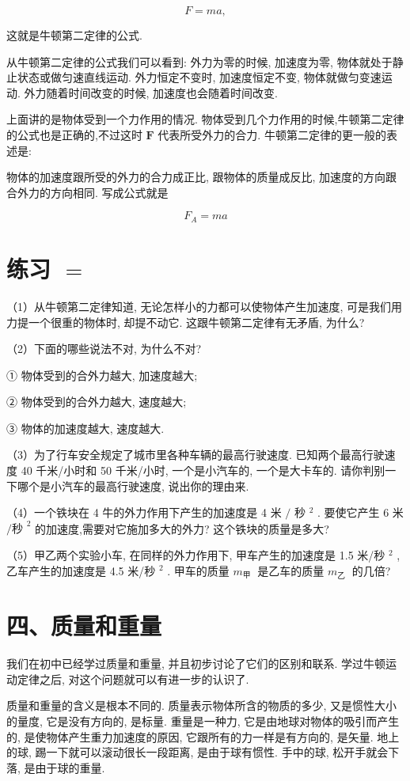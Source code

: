 \documentclass[10pt]{article}
\begin{document}
\[
F = {ma},
\]

这就是牛顿第二定律的公式.

从牛顿第二定律的公式我们可以看到: 外力为零的时候, 加速度为零, 物体就处于静止状态或做匀速直线运动. 外力恒定不变时, 加速度恒定不变, 物体就做匀变速运动. 外力随着时间改变的时候, 加速度也会随着时间改变.

上面讲的是物体受到一个力作用的情况. 物体受到几个力作用的时候,牛顿第二定律的公式也是正确的,不过这时 \(\mathbf{F}\) 代表所受外力的合力. 牛顿第二定律的更一般的表述是:

物体的加速度跟所受的外力的合力成正比, 跟物体的质量成反比, 加速度的方向跟合外力的方向相同. 写成公式就是

\[
{F}_{A} = {ma}
\]

\section*{练习 \(=\)}

（1）从牛顿第二定律知道, 无论怎样小的力都可以使物体产生加速度, 可是我们用力提一个很重的物体时, 却提不动它. 这跟牛顿第二定律有无矛盾, 为什么?

（2）下面的哪些说法不对, 为什么不对?

① 物体受到的合外力越大, 加速度越大;

② 物体受到的合外力越大, 速度越大;

③ 物体的加速度越大, 速度越大.

（3）为了行车安全规定了城市里各种车辆的最高行驶速度. 已知两个最高行驶速度 40 千米/小时和 50 千米/小时, 一个是小汽车的, 一个是大卡车的. 请你判别一下哪个是小汽车的最高行驶速度, 说出你的理由来.

（4）一个铁块在 4 牛的外力作用下产生的加速度是 4 米 \(/\) 秒 \({}^{2}\) . 要使它产生 6 米 \(/{\text{秒 }}^{2}\) 的加速度,需要对它施加多大的外力? 这个铁块的质量是多大?

（5）甲乙两个实验小车, 在同样的外力作用下, 甲车产生的加速度是 1.5 米/秒 \({}^{2}\) ,乙车产生的加速度是 4.5 米/秒 \({}^{2}\) . 甲车的质量 \({m}_{\text{甲 }}\) 是乙车的质量 \({m}_{\text{乙 }}\) 的几倍?

\section*{四、质量和重量}

我们在初中已经学过质量和重量, 并且初步讨论了它们的区别和联系. 学过牛顿运动定律之后, 对这个问题就可以有进一步的认识了.

质量和重量的含义是根本不同的. 质量表示物体所含的物质的多少, 又是惯性大小的量度, 它是没有方向的, 是标量. 重量是一种力, 它是由地球对物体的吸引而产生的, 是使物体产生重力加速度的原因, 它跟所有的力一样是有方向的, 是矢量. 地上的球, 踢一下就可以滚动很长一段距离, 是由于球有惯性. 手中的球, 松开手就会下落, 是由于球的重量.
\end{document}
